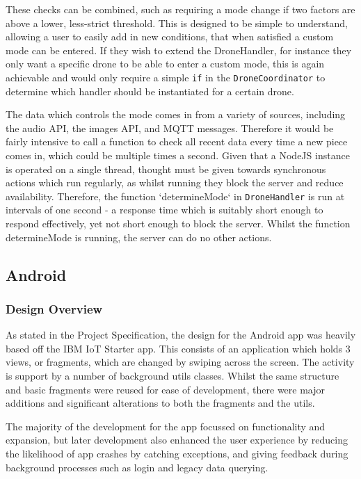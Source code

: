 \documentclass{article}
\begin{document}
These checks can be combined, such as requiring a mode change if two factors are above a lower, less-strict threshold. This is designed to be simple to understand, allowing a user to easily add in new conditions, that when satisfied a custom mode can be entered. If they wish to extend the DroneHandler, for instance they only want a specific drone to be able to enter a custom mode, this is again achievable and would only require a simple \texttt{if} in the \texttt{DroneCoordinator} to determine which handler should be instantiated for a certain drone.

The data which controls the mode comes in from a variety of sources, including the audio API, the images API, and MQTT messages. Therefore it would be fairly intensive to call a function to check all recent data every time a new piece comes in, which could be multiple times a second. Given that a NodeJS instance is operated on a single thread, thought must be given towards synchronous actions which run regularly, as whilst running they block the server and reduce availability. Therefore, the function `determineMode` in \texttt{DroneHandler} is run at intervals of one second - a response time which is suitably short enough to respond effectively, yet not short enough to block the server. Whilst the function determineMode is running, the server can do no other actions.


\subsection{Android}
\subsubsection{Design Overview}
As stated in the Project Specification, the design for the Android app was heavily based off the IBM IoT Starter app\cite{iotStarterAndroid}. This consists of an application which holds 3 views, or fragments, which are changed by swiping across the screen. The activity is support by a number of background utils classes. Whilst the same structure and basic fragments were reused for ease of development, there were major additions and significant alterations to both the fragments and the utils. 

The majority of the development for the app focussed on functionality and expansion, but later development also enhanced the user experience by reducing the likelihood of app crashes by catching exceptions, and giving feedback during background processes such as login and legacy data querying. 
\end{document}
